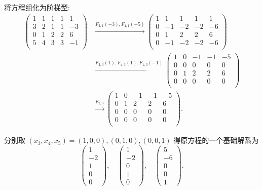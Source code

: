 \documentclass[color=black,device=normal,lang=cn,mode=geye]{elegantnote}
\begin{document}
\begin{solution}
    将方程组化为阶梯型:
    \begin{align*}
        \begin{pmatrix}
            1 & 1 & 1 & 1 & 1 \\
            3 & 2 & 1 & 1 & -3 \\
            0 & 1 & 2 & 2 & 6 \\
            5 & 4 & 3 & 3 & -1 \\
        \end{pmatrix} & \xrightarrow{F_{2,1}(-3),F_{4,1}(-5)}\begin{pmatrix}
            1 & 1 & 1 & 1 & 1 \\
            0 & -1 & -2 & -2 & -6 \\
            0 & 1 & 2 & 2 & 6 \\
            0 & -1 & -2 & -2 & -6 \\
        \end{pmatrix} \\
        & \xrightarrow{F_{2,3}(1),F_{4,3}(1),F_{1,3}(-1)}\begin{pmatrix}
            1 & 0 & -1 & -1 & -5 \\
            0 & 0 & 0 & 0 & 0 \\
            0 & 1 & 2 & 2 & 6 \\
            0 & 0 & 0 & 0 & 0 \\
        \end{pmatrix} \\
        & \xrightarrow{F_{2,3}}\begin{pmatrix}
            1 & 0 & -1 & -1 & -5 \\
            0 & 1 & 2 & 2 & 6 \\
            0 & 0 & 0 & 0 & 0 \\
            0 & 0 & 0 & 0 & 0 \\
        \end{pmatrix}.
    \end{align*}

    分别取 $(x_3,x_4,x_5)=(1,0,0),(0,1,0),(0,0,1)$ 得原方程的一个基础解系为
    \[\begin{pmatrix}
        1 \\ -2 \\ 1 \\ 0 \\ 0
    \end{pmatrix},\quad\begin{pmatrix}
        1 \\ -2 \\ 0 \\ 1 \\ 0
    \end{pmatrix},\quad\begin{pmatrix}
        5 \\ -6 \\ 0 \\ 0 \\ 1
    \end{pmatrix}.\]
\end{solution}
\end{document}
